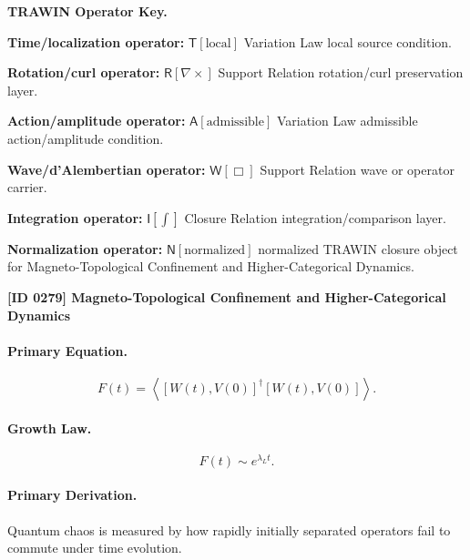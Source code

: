 \par\vspace{0.45\baselineskip}
\noindent\begin{minipage}[t]{\linewidth}
\begingroup
\small
\raggedright
\textbf{TRAWIN Operator Key.}\par
\noindent\textbf{Time/localization operator:} $\mathsf{T}\!\left[\mathrm{local}\right]$ Variation Law local source condition.\par
\noindent\textbf{Rotation/curl operator:} $\mathsf{R}\!\left[\nabla\times\right]$ Support Relation rotation/curl preservation layer.\par
\noindent\textbf{Action/amplitude operator:} $\mathsf{A}\!\left[\mathrm{admissible}\right]$ Variation Law admissible action/amplitude condition.\par
\noindent\textbf{Wave/d'Alembertian operator:} $\mathsf{W}\!\left[\Box\right]$ Support Relation wave or operator carrier.\par
\noindent\textbf{Integration operator:} $\mathsf{I}\!\left[\int\right]$ Closure Relation integration/comparison layer.\par
\noindent\textbf{Normalization operator:} $\mathsf{N}\!\left[\mathrm{normalized}\right]$ normalized TRAWIN closure object for Magneto-Topological Confinement and Higher-Categorical Dynamics.\par
\endgroup
\end{minipage}

\clearpage
\noindent\textbf{[ID 0279] Magneto-Topological Confinement and Higher-Categorical Dynamics}\par
\vspace{0.35em}
\paragraph{Primary Equation.}
\begin{equation}
F(t)
=
\left\langle
[W(t),V(0)]^\dagger
[W(t),V(0)]
\right\rangle .
\end{equation}

\paragraph{Growth Law.}
\begin{equation}
F(t)\sim e^{\lambda_L t}.
\end{equation}

\paragraph{Primary Derivation.}
Quantum chaos is measured by how rapidly initially separated operators fail to commute under time evolution.

